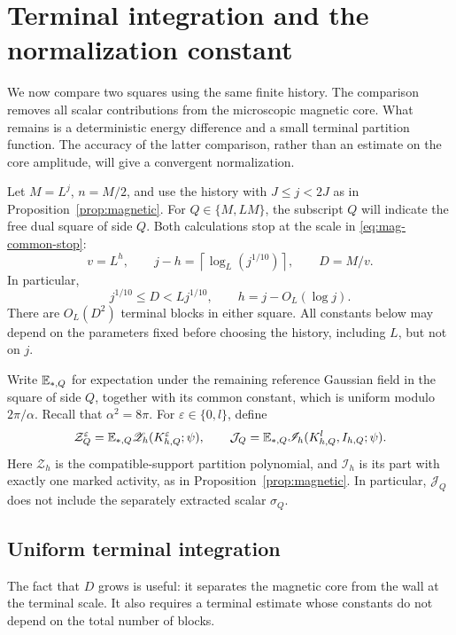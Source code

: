 \section{Terminal integration and the normalization constant}
\label{sec:terminal}

We now compare two squares using the same finite history.  The comparison
removes all scalar contributions from the microscopic magnetic core.
What remains is a deterministic energy difference and a small terminal
partition function.  The accuracy of the latter comparison, rather than
an estimate on the core amplitude, will give a convergent normalization.

Let $M=L^j$, $n=M/2$, and use the history with $J\leq j<2J$ as in
Proposition~\ref{prop:magnetic}.  For $Q\in\{M,LM\}$, the subscript $Q$
will indicate the free dual square of side $Q$.  Both calculations stop
at the scale in \eqref{eq:mag-common-stop}:
\begin{equation}
 v=L^h,\qquad
 j-h=\left\lceil\log_L(j^{1/10})\right\rceil,
 \qquad D=M/v.
 \label{eq:terminal-stop}
\end{equation}
In particular,
\begin{equation}
 j^{1/10}\leq D<Lj^{1/10},\qquad
 h=j-O_L(\log j).
 \label{eq:terminal-stop-size}
\end{equation}
There are $O_L(D^2)$ terminal blocks in either square.  All constants
below may depend on the parameters fixed before choosing the history,
including $L$, but not on $j$.

Write $\mathbb E_{*,Q}$ for expectation under the remaining reference Gaussian
field in the square of side $Q$, together with its common constant,
which is uniform modulo $2\pi/\alpha$.  Recall that $\alpha^2=8\pi$.
For $\varepsilon\in\{0,l\}$, define
\[
 \mathcal Z_Q^\varepsilon
 =\mathbb E_{*,Q}\mathscr Z_h(K^\varepsilon_{h,Q};\psi),
 \qquad
 \mathcal J_Q
 =\mathbb E_{*,Q}\mathscr I_h(K^l_{h,Q},I_{h,Q};\psi).
\]
Here $\mathscr Z_h$ is the compatible-support partition polynomial,
and $\mathscr I_h$ is its part with exactly one marked activity, as in
Proposition~\ref{prop:magnetic}.  In particular, $\mathcal J_Q$ does not
include the separately extracted scalar $\sigma_Q$.

\subsection{Uniform terminal integration}

The fact that $D$ grows is useful: it separates the magnetic core from
the wall at the terminal scale.  It also requires a terminal estimate
whose constants do not depend on the total number of blocks.

